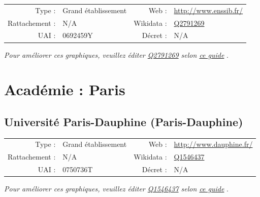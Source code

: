\documentclass[12pt,french,landscape]{article}
\begin{document}
\begin{tabular*}{0.45\textwidth}{rp{2cm}rl}  
\hline  
Type : & Grand établissement & Web : &\href{http://www.enssib.fr/}{http://www.enssib.fr/} \\  
Rattachement : & N/A & Wikidata : & \href{https://www.wikidata.org/entity/Q2791269}{Q2791269} \\  
UAI : & 0692459Y & Décret : & N/A \\  
\hline  
\end{tabular*}

\textit{\scriptsize Pour améliorer ces graphiques, veuillez éditer \href{https://www.wikidata.org/entity/Q2791269}{Q2791269}  selon \href{https://github.com/cpesr/wikidataESR/blob/master/Rmd/wikidataESR.md}{ce guide}}
.


\newpage

\hypertarget{acaduxe9mie-paris-1}{%
\section{Académie : Paris}\label{acaduxe9mie-paris-1}}

\hypertarget{universituxe9-paris-dauphine-paris-dauphine}{%
\subsection{Université Paris-Dauphine
(Paris-Dauphine)}\label{universituxe9-paris-dauphine-paris-dauphine}}

\begin{tabular*}{0.45\textwidth}{rp{2cm}rl}  
\hline  
Type : & Grand établissement & Web : &\href{http://www.dauphine.fr/}{http://www.dauphine.fr/} \\  
Rattachement : & N/A & Wikidata : & \href{https://www.wikidata.org/entity/Q1546437}{Q1546437} \\  
UAI : & 0750736T & Décret : & N/A \\  
\hline  
\end{tabular*}

\textit{\scriptsize Pour améliorer ces graphiques, veuillez éditer \href{https://www.wikidata.org/entity/Q1546437}{Q1546437}  selon \href{https://github.com/cpesr/wikidataESR/blob/master/Rmd/wikidataESR.md}{ce guide}}
.

\end{document}
